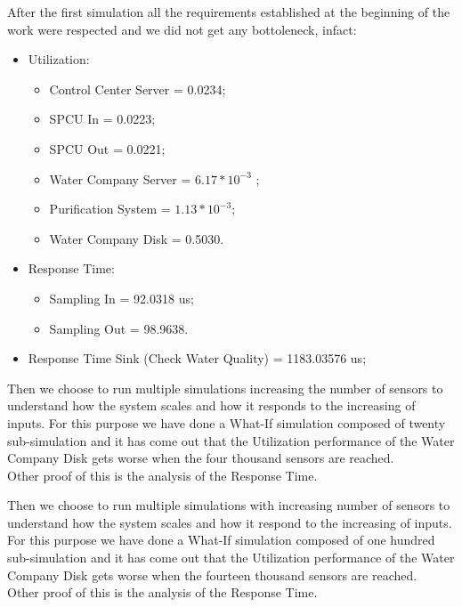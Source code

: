 After the first simulation all the requirements established at the beginning of the work were respected and we did not get any bottoleneck, infact: 
\begin{itemize}
	\item Utilization:
	\begin{itemize}
		\item Control Center Server = 0.0234;
		\item SPCU In = 0.0223;
		\item SPCU Out = 0.0221;
		\item Water Company Server = $ 6.17*10^{-3}$ ;
		\item Purification System = $ 1.13*10^{-3}$;
		\item Water Company Disk = 0.5030.
	\end{itemize}
	\item Response Time:
	\begin{itemize}
		\item Sampling In = 92.0318 us;
		\item Sampling Out = 98.9638.
	\end{itemize}
	\item Response Time Sink (Check Water Quality) = 1183.03576 us;
\end{itemize}

Then we choose to run multiple simulations increasing the number of sensors to understand how the system scales and how it responds to the increasing of inputs. For this purpose we have done a What-If simulation composed of twenty sub-simulation and it has come out that the Utilization performance of the Water Company Disk gets worse when the four thousand sensors are reached.\\
Other proof of this is the analysis of the Response Time.

\begin{center}
\end{center}
\bigskip

Then we choose to run multiple simulations with increasing number of sensors to understand how the system scales and how it
respond to the increasing of inputs. For this purpose we have done a What-If simulation composed of one hundred sub-simulation and it has come out that the Utilization performance of the Water Company Disk gets worse when the fourteen thousand sensors are reached.\\
Other proof of this is the analysis of the Response Time.\\

